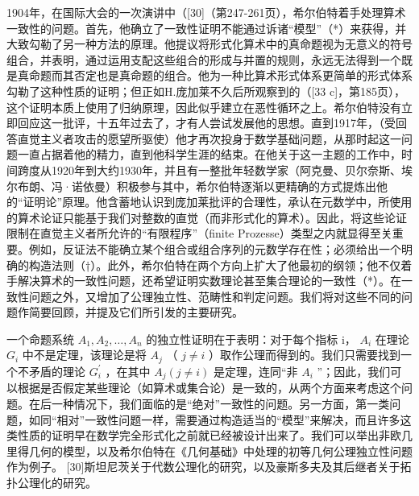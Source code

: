 1904年，在国际大会的一次演讲中（{[}30{]}（第247-261页），希尔伯特着手处理算术一致性的问题。首先，他确立了一致性证明不能通过诉诸“模型”（*）来获得，并大致勾勒了另一种方法的原理。他提议将形式化算术中的真命题视为无意义的符号组合，并表明，通过运用支配这些组合的形成与并置的规则，永远无法得到一个既是真命题而其否定也是真命题的组合。他为一种比算术形式体系更简单的形式体系勾勒了这种性质的证明；但正如H.庞加莱不久后所观察到的（{[}33 c{]}，第185页），这个证明本质上使用了归纳原理，因此似乎建立在恶性循环之上。希尔伯特没有立即回应这一批评，十五年过去了，才有人尝试发展他的思想。直到1917年，（受回答直觉主义者攻击的愿望所驱使）他才再次投身于数学基础问题，从那时起这一问题一直占据着他的精力，直到他科学生涯的结束。在他关于这一主题的工作中，时间跨度从1920年到大约1930年，并且有一整批年轻数学家（阿克曼、贝尔奈斯、埃尔布朗、冯·诺依曼）积极参与其中，希尔伯特逐渐以更精确的方式提炼出他的“证明论”原理。他含蓄地认识到庞加莱批评的合理性，承认在元数学中，所使用的算术论证只能基于我们对整数的直觉（而非形式化的算术）。因此，将这些论证限制在直觉主义者所允许的“有限程序”（finite Prozesse）类型之内就显得至关重要。例如，反证法不能确立某个组合或组合序列的元数学存在性；必须给出一个明确的构造法则（†）。此外，希尔伯特在两个方向上扩大了他最初的纲领；他不仅着手解决算术的一致性问题，还希望证明实数理论甚至集合理论的一致性（*）。在一致性问题之外，又增加了公理独立性、范畴性和判定问题。我们将对这些不同的问题作简要回顾，并提及它们所引发的主要研究。

一个命题系统 \(A_{1}, A_{2}, \ldots, A_{n}\) 的独立性证明在于表明：对于每个指标 i， \(A_{i}\) 在理论 \(G_{i}\) 中不是定理，该理论是将 \(A_{j}\) （ \(j \neq i\) ）取作公理而得到的。我们只需要找到一个不矛盾的理论 \(G_{i}^{\prime}\) ，在其中 \(A_{j} (j \neq i)\) 是定理，连同“非 \(A_{i}\) ”；因此，我们可以根据是否假定某些理论（如算术或集合论）是一致的，从两个方面来考虑这个问题。在后一种情况下，我们面临的是“绝对”一致性的问题。另一方面，第一类问题，如同“相对”一致性问题一样，需要通过构造适当的“模型”来解决，而且许多这类性质的证明早在数学完全形式化之前就已经被设计出来了。我们可以举出非欧几里得几何的模型，以及希尔伯特在《几何基础》中处理的初等几何公理独立性问题作为例子。 {[}30{]}斯坦尼茨关于代数公理化的研究，以及豪斯多夫及其后继者关于拓扑公理化的研究。


